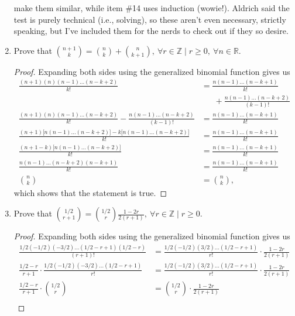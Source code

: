 \documentclass{article}
\renewcommand{\labelenumi}{\colorbox{pink}{\textbf{\arabic{enumi}}}}
\begin{document}
\begin{enumerate}
{\begin{minipage}[t]{.76\textwidth}
        make them similar, while item \#14 uses induction (wowie!). Aldrich said the test is purely technical (i.e., solving), so these aren't even necessary, strictly speaking, 
        but I've included them for the nerds to check out if they so desire. 
    \end{minipage}%
    }
    \renewcommand{\labelenumi}{\fcolorbox{magenta}{white}{\textbf{\arabic{enumi}}}}
    \item Prove that $\displaystyle \binom{n+1}{k} = \binom{n}{k} + \binom{n}{k+1},~\forall r \in \mathbb{Z} \mid r \geq 0,~\forall n \in \mathbb{R}$.\begin{proof} 
        Expanding both sides using the generalized binomial function gives us\begin{align*} 
            \frac{(n+1)(n)(n-1)\hdots(n-k+2)}{k!} &= \frac{n(n-1)\hdots(n-k+1)}{k!}  \\
            &\phantom{=}\ + \frac{n(n-1)\hdots(n-k+2)}{(k-1)!} \\
            \frac{(n+1)(n)(n-1)\hdots(n-k+2)}{k!} - \frac{n(n-1)\hdots(n-k+2)}{(k-1)!} &= \frac{n(n-1)\hdots(n-k+1)}{k!} \\
            \frac{(n+1)\big[n(n-1)\hdots(n-k+2)\big] - k\big[n(n-1)\hdots(n-k+2)\big]}{k!} &= \frac{n(n-1)\hdots(n-k+1)}{k!} \\ 
            \frac{(n+1-k)\big[n(n-1)\hdots(n-k+2)\big]}{k!} &= \frac{n(n-1)\hdots(n-k+1)}{k!} \\ 
            \frac{n(n-1)\hdots(n-k+2)(n-k+1)}{k!} &= \frac{n(n-1)\hdots(n-k+1)}{k!} \\ 
            \binom{n}{k} &= \binom{n}{k},
        \end{align*} which shows that the statement is true. 
    \end{proof} 
    \item Prove that $\displaystyle{} \binom{1/2}{r+1} = \binom{1/2}{r} \frac{1-2r}{2(r+1)},~\forall r \in \mathbb{Z} \mid r \geq 0$.\begin{proof} 
        Expanding both sides using the generalized binomial function gives us\begin{align*} 
            \frac{1/2 (-1/2) (-3/2) \hdots (1/2-r+1)(1/2-r)}{(r+1)!} &= \frac{1/2(-1/2)(3/2)\hdots(1/2-r+1)}{r!} \cdot \frac{1-2r}{2(r+1)} \\
            \frac{1/2 -r}{r+1} \cdot \frac{1/2(-1/2)(-3/2) \hdots (1/2 -r + 1)}{r!} &= \frac{1/2(-1/2)(3/2)\hdots(1/2-r+1)}{r!} \cdot \frac{1-2r}{2(r+1)} \\ 
            \frac{1/2 -r}{r+1} \cdot \binom{1/2}{r} &= \binom{1/2}{r} \cdot \frac{1-2r}{2(r+1)} \\ 

\end{align*}
\end{proof}
\end{enumerate}
\end{document}
